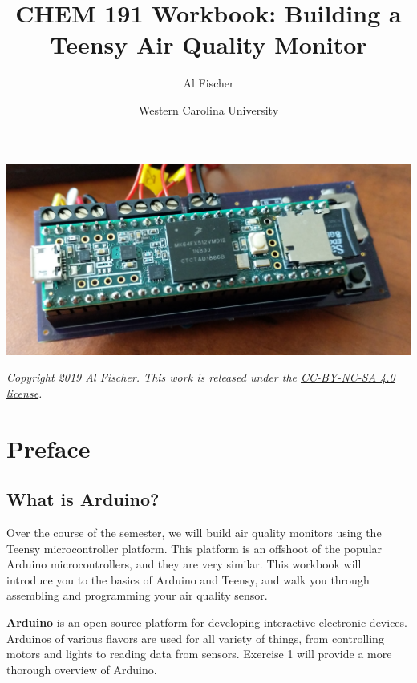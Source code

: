 \documentclass[]{book}
\title{CHEM 191 Workbook: Building a Teensy Air Quality Monitor}
\author{Al Fischer}
\date{Western Carolina University}
\begin{document}
\maketitle

{
\setcounter{tocdepth}{1}
\tableofcontents
}
\hypertarget{section}{%
\chapter*{}\label{section}}

\includegraphics{images/teensy_aqm.jpg}

\emph{Copyright 2019 Al Fischer. This work is released under the \href{https://creativecommons.org/licenses/by-sa/4.0/}{CC-BY-NC-SA 4.0 license}.}

\hypertarget{preface}{%
\chapter*{Preface}\label{preface}}

\hypertarget{what-is-arduino}{%
\section*{What is Arduino?}\label{what-is-arduino}}

Over the course of the semester, we will build air quality monitors using the Teensy microcontroller platform. This platform is an offshoot of the popular Arduino microcontrollers, and they are very similar. This workbook will introduce you to the basics of Arduino and Teensy, and walk you through assembling and programming your air quality sensor.

\textbf{Arduino} is an \href{http://www.wikipedia.com/wiki/Open-source}{open-source} platform for developing interactive electronic devices. Arduinos of various flavors are used for all variety of things, from controlling motors and lights to reading data from sensors. Exercise 1 will provide a more thorough overview of Arduino.
\end{document}
